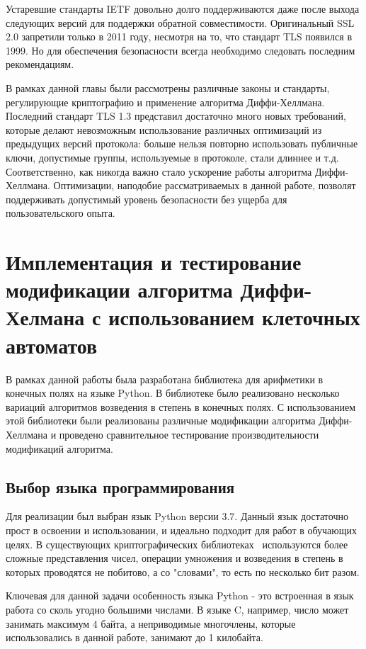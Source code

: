 \documentclass[times,specification,annotation]{itmo-student-thesis}
\begin{document}
Устаревшие стандарты IETF довольно долго поддерживаются даже после выхода следующих версий для поддержки обратной совместимости.
Оригинальный SSL 2.0 запретили только в 2011 году, несмотря на то, что стандарт TLS появился в 1999.
Но для обеспечения безопасности всегда необходимо следовать последним рекомендациям.

\chapterconclusion

В рамках данной главы были рассмотрены различные законы и стандарты, регулирующие криптографию и применение алгоритма
Диффи-Хеллмана.
Последний стандарт TLS 1.3 представил достаточно много новых требований, которые делают невозможным использование
различных оптимизаций из предыдущих версий протокола: больше нельзя повторно использовать публичные ключи, допустимые
группы, используемые в протоколе, стали длиннее и т.д.
Соответственно, как никогда важно стало ускорение работы алгоритма Диффи-Хеллмана.
Оптимизации, наподобие рассматриваемых в данной работе, позволят поддерживать допустимый уровень безопасности
без ущерба для пользовательского опыта.

\chapter{Имплементация и тестирование модификации алгоритма Диффи-Хелмана с использованием клеточных автоматов}

В рамках данной работы была разработана библиотека для арифметики в конечных полях на языке Python.
В библиотеке было реализовано несколько вариаций алгоритмов возведения в степень в конечных полях.
С использованием этой библиотеки были реализованы различные модификации алгоритма Диффи-Хеллмана и
проведено сравнительное тестирование производительности модификаций алгоритма.

\section{Выбор языка программирования}\label{sec:prog}

Для реализации был выбран язык Python версии 3.7.
Данный язык достаточно прост в освоении и использовании, и идеально подходит для работ в обучающих целях.
В существующих криптографических библиотеках~\cite{openssl} используются более сложные представления чисел,
операции умножения и возведения в степень в которых проводятся не побитово, а со "словами", то есть по несколько бит разом.

Ключевая для данной задачи особенность языка Python - это встроенная в язык работа со сколь угодно большими числами.
В языке C, например, число может занимать максимум 4 байта, а неприводимые многочлены, которые использовались
в данной работе, занимают до 1 килобайта.
\end{document}
